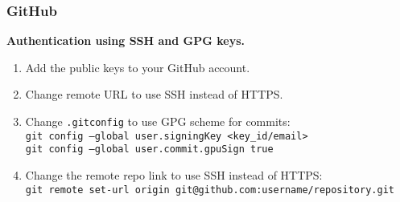 \subsubsection*{GitHub}
\textbf{Authentication using SSH and GPG keys.}
\begin{enumerate}
\item Add the public keys to your GitHub account.\\
\item Change remote URL to use SSH instead of HTTPS.\\
\item Change \texttt{.gitconfig} to use GPG scheme for commits:\\
        \texttt{git config --global user.signingKey <key\_id/email>}\\
        \texttt{git config --global user.commit.gpuSign true}\\
\item Change the remote repo link to use SSH instead of HTTPS:\\
        \texttt{git remote set-url origin git@github.com:username/repository.git}
\end{enumerate}



\vfill \null
\pagebreak

